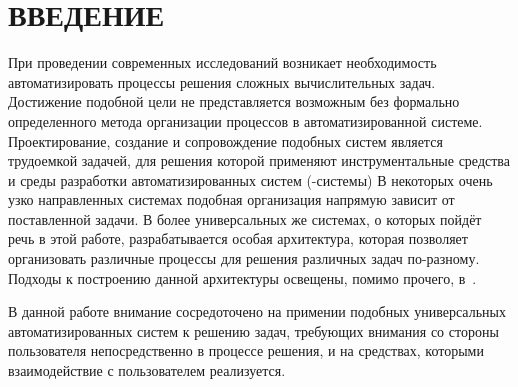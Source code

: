 \chapter*{ВВЕДЕНИЕ}\label{chap.introduction}

При проведении современных исследований возникает необходимость автоматизировать процессы решения сложных вычислительных задач. Достижение подобной цели не представляется возможным без формально определенного метода организации процессов в автоматизированной системе. Проектирование, создание и сопровождение подобных систем является трудоемкой задачей, для решения которой применяют инструментальные средства и среды разработки автоматизированных систем (-системы)\cite{Golubev2020} В некоторых очень узко направленных системах подобная организация напрямую зависит от поставленной задачи. В более универсальных же системах, о которых пойдёт речь в этой работе, разрабатывается особая архитектура, которая позволяет организовать различные процессы для решения различных задач по-разному. Подходы к построению данной архитектуры освещены, помимо прочего, в~\cite{SokolovCADCMConcept2020}. 

В данной работе внимание сосредоточено на примении подобных универсальных автоматизированных систем к решению задач, требующих внимания со стороны пользователя непосредственно в процессе решения, и на средствах, которыми взаимодействие с пользователем реализуется.


